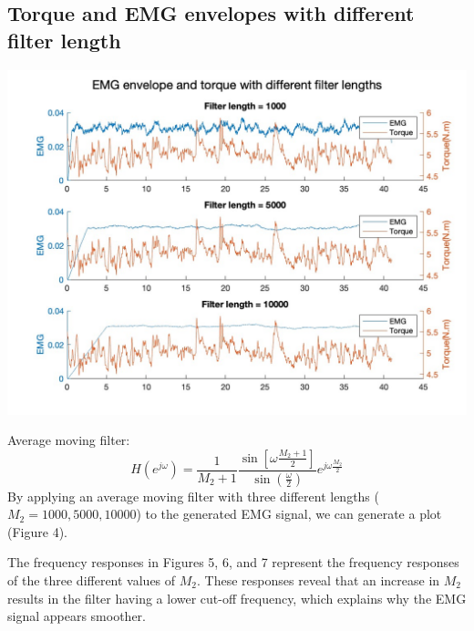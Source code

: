 \documentclass[8pt]{article}  %
\theoremstyle{plain}
\theoremstyle{definition}
\theoremstyle{remark}
\begin{document}
    \subsection{Torque and EMG envelopes with different filter length}
    \begin{minipage}{0.6\textwidth}
    \includegraphics[width=\linewidth]{figure/figure_4.jpg}
    \end{minipage}
    \begin{minipage}{0.5\textwidth}
        Average moving filter:
        \[ H(e^{j\omega}) = \frac{1}{M_2 +1} \frac{\sin[\omega \frac{M_2 + 1}{2}]}{\sin(\frac{\omega}{2})} e^{j\omega\frac{M_2}{2}}\] 
        By applying an average moving filter with three different lengths ($M_2 = 1000, 5000, 10000$) to the generated EMG signal, we can generate a plot (Figure 4).

The frequency responses in Figures 5, 6, and 7 represent the frequency responses of the three different values of $M_2$. These responses reveal that an increase in $M_2$ results in the filter having a lower cut-off frequency, which explains why the EMG signal appears smoother.
    \end{minipage}
\end{document}
